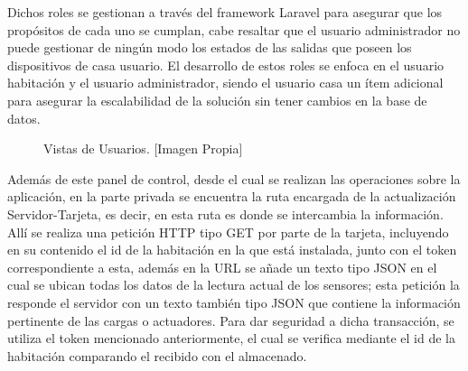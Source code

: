 Dichos roles se gestionan a través del framework Laravel para asegurar que los propósitos de cada uno se cumplan, cabe resaltar que el usuario administrador no puede gestionar de ningún modo los estados de las salidas que poseen los dispositivos de casa usuario. El desarrollo de estos roles se enfoca en el usuario habitación y el usuario administrador, siendo el usuario casa un ítem adicional para asegurar la escalabilidad de la solución sin tener cambios en la base de datos.\\

\begin{figure}[!t]
	\centering
	\caption[Vistas de Usuarios.]{Vistas de Usuarios. [Imagen Propia]}
	\label{fig:views}
\end{figure}

Además de este panel de control, desde el cual se realizan las operaciones sobre la aplicación, en la parte privada se encuentra la ruta encargada de la actualización Servidor-Tarjeta, es decir, en esta ruta es donde se intercambia la información. Allí se realiza una petición HTTP tipo GET por parte de la tarjeta, incluyendo en su contenido el id de la habitación en la que está instalada, junto con el token correspondiente a esta, además en la URL se añade un texto tipo JSON en el cual se ubican todas los datos de la lectura actual de los sensores; esta petición la responde el servidor con un texto también tipo JSON que contiene la información pertinente de las cargas o actuadores. Para dar seguridad a dicha transacción, se utiliza el token mencionado anteriormente, el cual se verifica mediante el id de la habitación comparando el recibido con el almacenado.\\

